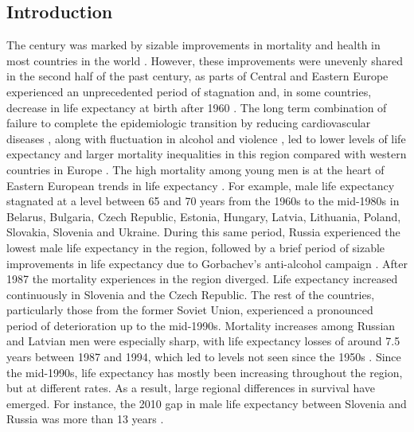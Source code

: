 \documentclass{article}
\begin{document}
\begin{spacing}{1.5}
\section*{Introduction}
The  century was marked by sizable improvements in mortality and health in most countries in the world \citep{who2000}. However, these improvements were unevenly shared in the second half of the past century, as parts of Central and Eastern Europe experienced an unprecedented period of stagnation and, in some countries, decrease in life expectancy at birth after 1960 \citep{HMD}. The long term combination of failure to complete the epidemiologic transition by reducing cardiovascular diseases \citep{caselli2002epidemiologic}, along with fluctuation in alcohol and violence \citep{bye2008alcohol,leon1997huge}, led to lower levels of life expectancy and larger mortality inequalities in this region compared with western countries in Europe \citep{mackenbach2008socioeconomic}. The high mortality among young men is at the heart of Eastern European trends in life expectancy \citep{mckee2001}. For example, male life expectancy stagnated at a level between 65 and 70 years from the 1960s to the mid-1980s in Belarus, Bulgaria, Czech Republic, Estonia, Hungary, Latvia, Lithuania, Poland, Slovakia, Slovenia and Ukraine. During this same period, Russia experienced the lowest male life expectancy in the region, followed by a brief period of sizable improvements in life expectancy due to Gorbachev's anti-alcohol campaign \citep{leon1998social}. After 1987 the mortality experiences in the region diverged. Life expectancy increased continuously in Slovenia and the Czech Republic. The rest of the countries, particularly those from the former Soviet Union, experienced a pronounced period of deterioration up to the mid-1990s. Mortality increases among Russian and Latvian men were especially sharp, with life expectancy losses of around 7.5 years between 1987 and 1994, which led to levels not seen since the 1950s \citep{shkolnikov2001}. Since the mid-1990s, life expectancy has mostly been increasing throughout the region, but at different rates. As a result, large regional differences in survival have emerged. For instance, the 2010 gap in male life expectancy between Slovenia and Russia was more than 13 years \citep{HMD}.\\


\end{spacing}
\end{document}
